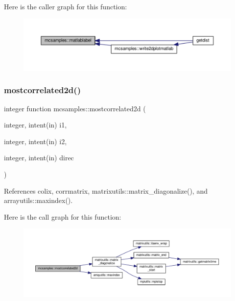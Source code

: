 Here is the caller graph for this function\+:
\nopagebreak
\begin{figure}[H]
\begin{center}
\leavevmode
\includegraphics[width=350pt]{namespacemcsamples_ab0762a08afdb1f7f972b966091ef0918_icgraph}
\end{center}
\end{figure}
\mbox{\label{namespacemcsamples_ac9c93f48a6a5f4c22e5f35b060bcab20}} 
\subsubsection{\texorpdfstring{mostcorrelated2d()}{mostcorrelated2d()}}
{\footnotesize\ttfamily integer function mcsamples\+::mostcorrelated2d (\begin{DoxyParamCaption}\item[{integer, intent(in)}]{i1,  }\item[{integer, intent(in)}]{i2,  }\item[{integer, intent(in)}]{direc }\end{DoxyParamCaption})}



References colix, corrmatrix, matrixutils\+::matrix\+\_\+diagonalize(), and arrayutils\+::maxindex().

Here is the call graph for this function\+:
\nopagebreak
\begin{figure}[H]
\begin{center}
\leavevmode
\includegraphics[width=350pt]{namespacemcsamples_ac9c93f48a6a5f4c22e5f35b060bcab20_cgraph}
\end{center}
\end{figure}
\mbox{\label{namespacemcsamples_a72e8a848ae68643f3449e12e33334870}} 
